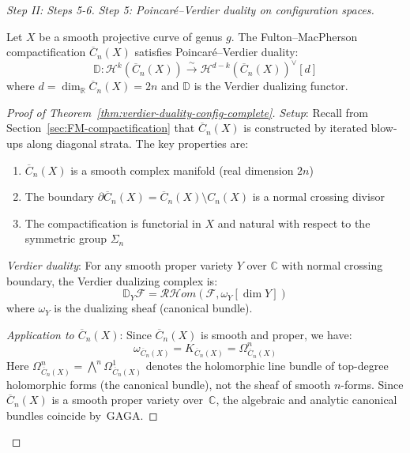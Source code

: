 \begin{proof}[Step II: Steps 5-6]

\emph{Step 5: Poincaré--Verdier duality on configuration spaces.}

\begin{theorem}
\label{thm:verdier-duality-config-complete}
Let $X$ be a smooth projective curve of genus $g$. The Fulton--MacPherson
compactification $\overline{C}_n(X)$ satisfies Poincaré--Verdier duality:
\begin{equation}
\mathbb{D}: \mathcal{H}^k(\overline{C}_n(X)) \xrightarrow{\sim} \mathcal{H}^{d-k}(
\overline{C}_n(X))^\vee[d]
\end{equation}
where $d = \dim_{\mathbb{R}} \overline{C}_n(X) = 2n$ and $\mathbb{D}$ is the Verdier 
dualizing functor.
\end{theorem}

\begin{proof}[Proof of Theorem~\ref{thm:verdier-duality-config-complete}]
\emph{Setup}: Recall from Section~\ref{sec:FM-compactification} that $\overline{C}_n(X)$ 
is constructed by iterated blow-ups along diagonal strata. The key properties are:
\begin{enumerate}
\item $\overline{C}_n(X)$ is a smooth complex manifold (real dimension $2n$)
\item The boundary $\partial \overline{C}_n(X) = \overline{C}_n(X) \setminus C_n(X)$ 
is a normal crossing divisor
\item The compactification is functorial in $X$ and natural with respect to the 
symmetric group $\Sigma_n$
\end{enumerate}

\emph{Verdier duality}: For any smooth proper variety $Y$ over $\mathbb{C}$ with 
normal crossing boundary, the Verdier dualizing complex is:
\begin{equation}
\mathbb{D}_Y \mathcal{F} = \mathcal{RH}om(\mathcal{F}, \omega_Y[\dim Y])
\end{equation}
where $\omega_Y$ is the dualizing sheaf (canonical bundle).

\emph{Application to $\overline{C}_n(X)$}: Since $\overline{C}_n(X)$ is smooth and 
proper, we have:
\begin{equation}
\omega_{\overline{C}_n(X)} = K_{\overline{C}_n(X)} = \Omega^{n}_{\overline{C}_n(X)}
\end{equation}
Here $\Omega^n_{\overline{C}_n(X)} = \bigwedge^n \Omega^1_{\overline{C}_n(X)}$ denotes the holomorphic line bundle of top-degree holomorphic forms (the canonical bundle), not the sheaf of smooth $n$-forms.
Since $\overline{C}_n(X)$ is a smooth proper variety over~$\mathbb{C}$, the algebraic and analytic canonical bundles coincide by~GAGA.


\end{proof}
\end{proof}
